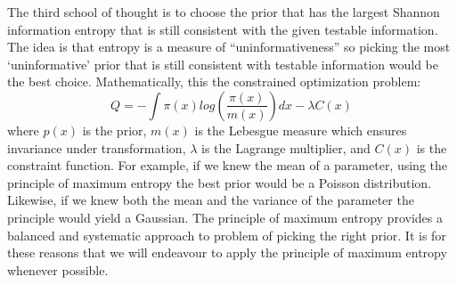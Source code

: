 \documentclass[12pt]{article}
\numberwithin{equation}{section}
\begin{document}
The third school of thought is to choose the prior that has the largest Shannon information entropy that is still consistent with the given testable information. The idea is that entropy is a measure of ``uninformativeness'' so picking the most `uninformative' prior that is still consistent with testable information would be the best choice. Mathematically, this the constrained optimization problem:
\begin{equation} \label{eq:maxent}
	Q = -\int \pi(x) log(\frac{\pi(x)}{m(x)})dx - \lambda C(x) 
\end{equation}
where $p(x)$ is the prior, $m(x)$ is the Lebesgue measure which ensures invariance under transformation, $\lambda$ is the Lagrange multiplier, and $C(x)$ is the constraint function. For example, if we knew the mean of a parameter, using the principle of maximum entropy the best prior would be a Poisson distribution. Likewise, if we knew both the mean and the variance of the parameter the principle would yield a Gaussian. The principle of maximum entropy provides a balanced and systematic approach to problem of picking the right prior. It is for these reasons that we will endeavour to apply the principle of maximum entropy whenever possible.   
\end{document}
